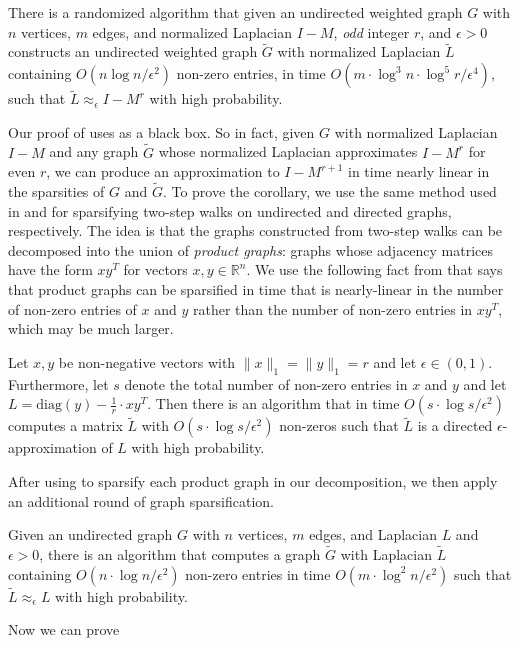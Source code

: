 \documentclass{toc}
\newcommand{\wt}{\widetilde}   %
\numberwithin{myalgctr}{section}
\theoremstyle{named}
\begin{document}
\begin{corollary}
\label{cor:lintime}
There is a randomized algorithm that given an undirected weighted graph $G$ with $n$ vertices, $m$ edges, and normalized Laplacian $I-M$, \emph{odd} integer $r$, and $\epsilon>0$ constructs an undirected weighted graph $\wt{G}$ with normalized Laplacian $\wt{L}$ containing $O(n\log n/\epsilon^2)$ non-zero entries, in time $O(m\cdot \log^3 n\cdot \log^5 r/\epsilon^4)$, such that $\wt{L}\approx_{\epsilon}I-M^r$ with high probability.
\end{corollary}

Our proof of  uses  as a black box. So in fact, given $G$ with normalized Laplacian $I-M$ and any graph $\wt{G}$ whose normalized Laplacian approximates $I-M^r$ for even $r$, we can produce an approximation to $I-M^{r+1}$ in time nearly linear in the sparsities of $G$ and $\wt{G}$. To prove the corollary, we use the same method used in \cite{PS13} and \cite{CKPPRSV16} for sparsifying two-step walks on undirected and directed graphs, respectively. The idea is that the graphs constructed from two-step walks can be decomposed into the union of \emph{product graphs}: graphs whose adjacency matrices have the form $xy^{T}$ for vectors $x,y\in\mathbb{R}^n$. We use the following fact from \cite{CKPPRSV16} that says that product graphs can be sparsified in time that is nearly-linear in the number of non-zero entries of $x$ and $y$ rather than the number of non-zero entries in $xy^{T}$, which may be much larger. 


\begin{lemma}
\label{lem:sparsifyproduct}
Let $x,y$ be non-negative vectors with $\|x\|_1=\|y\|_1=r$ and let $\epsilon\in(0,1)$. Furthermore, let $s$ denote the total number of non-zero entries in $x$ and $y$ and let $L=\mathrm{diag}(y)-\frac{1}{r}\cdot xy^T$. Then there is an algorithm that in time $O(s\cdot\log s/\epsilon^2)$ computes a matrix $\wt{L}$ with $O(s\cdot\log s/\epsilon^2)$ non-zeros such that $\wt{L}$ is a directed $\epsilon$-approximation of $L$ with high probability.
\end{lemma}

After using  to sparsify each product graph in our decomposition, we then apply an additional round of graph sparsification.

\begin{lemma}
\label{lem:st}
Given an undirected graph $G$ with $n$ vertices, $m$ edges, and Laplacian $L$ and $\epsilon>0$, there is an algorithm that computes a graph $\wt{G}$ with Laplacian $\wt{L}$ containing $O(n\cdot\log n/\epsilon^2)$ non-zero entries in time $O(m\cdot \log^2 n/\epsilon^2)$ such that $\wt{L}\approx_{\epsilon}L$ with high probability. 
\end{lemma}
Now we can prove 
\end{document}
